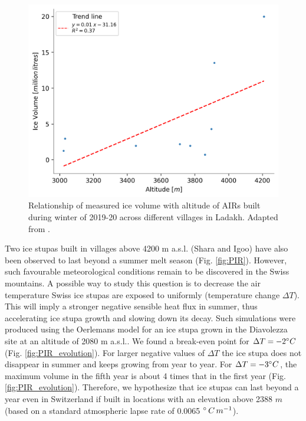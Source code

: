 \begin{figure}[htb]
	\centering
	\includegraphics[width=\textwidth]{figs/altitudevsvolume.png}
	\caption{Relationship of measured ice volume with altitude of \ac{AIRs} built during winter of 2019-20 across
		different villages in Ladakh. Adapted from \citet{mariagruberIceStupasLadakh2022}.}
	\label{fig:altvsvol}
\end{figure}

Two ice stupas built in villages above 4200 m \ac{a.s.l.} (Shara and Igoo) have also been observed to last
beyond a summer melt season (Fig. \ref{fig:PIR}). However, such favourable meteorological conditions remain to
be discovered in the Swiss mountains. A possible way to study this question is to decrease the air temperature
Swiss ice stupas are exposed to uniformly (temperature change $\Delta T$). This will imply a stronger negative
sensible heat flux in summer, thus accelerating ice stupa growth and slowing down its decay. Such simulations
were produced using the Oerlemans model for an ice stupa grown in the Diavolezza site at an altitude of 2080 m
\ac{a.s.l.}. We found a break-even point for $\Delta T = -2 ^{\circ} C$ (Fig. \ref{fig:PIR_evolution}). For
larger negative values of $\Delta T$ the ice stupa does not disappear in summer and keeps growing from year to
year. For $\Delta T = -3 ^{\circ} C$, the maximum volume in the fifth year is about 4 times that in the first
year (Fig. \ref{fig:PIR_evolution}). Therefore, we hypothesize that ice stupas can last beyond a year even in
Switzerland if built in locations with an elevation above 2388 $m$ (based on a standard atmospheric lapse rate
of 0.0065 $^{\circ}\,C\,m^{-1}$).

